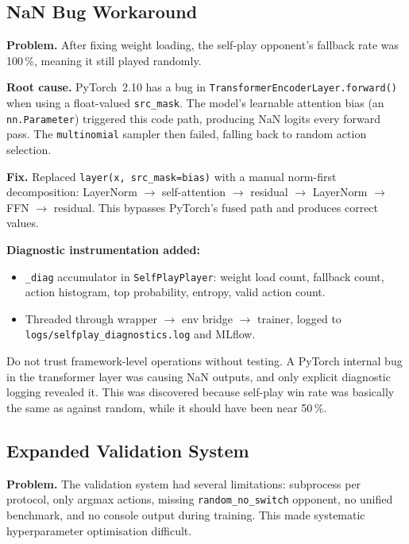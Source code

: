 \subsection{NaN Bug Workaround}

\textbf{Problem.} After fixing weight loading, the self-play opponent's
fallback rate was 100\,\%, meaning it still played randomly.

\textbf{Root cause.} PyTorch~2.10 has a bug in
\texttt{TransformerEncoderLayer.forward()} when using a float-valued
\texttt{src\_mask}.  The model's learnable attention bias (an
\texttt{nn.Parameter}) triggered this code path, producing NaN logits every
forward pass.  The \texttt{multinomial} sampler then failed, falling back to
random action selection.

\textbf{Fix.} Replaced \texttt{layer(x, src\_mask=bias)} with a manual
norm-first decomposition: LayerNorm $\to$ self-attention $\to$ residual
$\to$ LayerNorm $\to$ FFN $\to$ residual.  This bypasses PyTorch's fused path
and produces correct values.

\textbf{Diagnostic instrumentation added:}
\begin{itemize}
  \item \texttt{\_diag} accumulator in \texttt{SelfPlayPlayer}: weight load
        count, fallback count, action histogram, top probability, entropy,
        valid action count.
  \item Threaded through wrapper $\to$ env bridge $\to$ trainer, logged to
        \texttt{logs/selfplay\_diagnostics.log} and MLflow.
\end{itemize}

\begin{keyinsight}
Do not trust framework-level operations without testing.  A PyTorch internal
bug in the transformer layer was causing NaN outputs, and only explicit
diagnostic logging revealed it. This was discovered because self-play win rate
was basically the same as against random, while it should have been near 50\,\%.
\end{keyinsight}

\subsection{Expanded Validation System}

\textbf{Problem.} The validation system had several limitations: subprocess
per protocol, only argmax actions, missing
\texttt{random\_no\_switch} opponent, no unified benchmark, and no console
output during training.  This made systematic hyperparameter optimisation
difficult.

